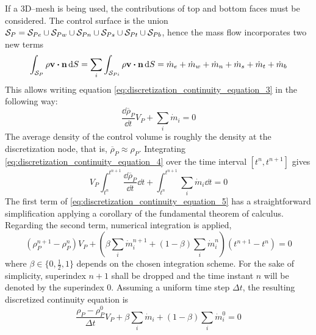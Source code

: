 If a 3D--mesh is being used, the contributions of top and bottom faces must be considered. The control surface is the union $\mathcal{S}_{P} = \mathcal{S}_{Pe} \cup \mathcal{S}_{Pw} \cup \mathcal{S}_{Pn} \cup \mathcal{S}_{Ps} \cup \mathcal{S}_{Pt} \cup \mathcal{S}_{Pb}$, hence the mass flow incorporates two new terms
\begin{equation}
	\int_{\cs{P}} \rho \vb{v} \vdot \vb{n} \dd{S} = 
	\sum_{i} \int_{\cs{Pi}} \rho \vb{v} \vdot \vb{n} \dd{S} = 
	\dot{m}_e + \dot{m}_w + \dot{m}_n + \dot{m}_s + \dot{m}_t + \dot{m}_b
\end{equation}
This allows writing equation \eqref{eq:discretization_continuity_equation_3} in the following way:
\begin{equation} \label{eq:discretization_continuity_equation_4}
	\frac{\dd \overline{\rho}_P}{\dd{t}} V_P + \sum_i \dot{m}_i = 0
\end{equation}
The average density of the control volume is roughly the density at the discretization node, that is, $\overline{\rho}_P \approx \rho_P$. Integrating \eqref{eq:discretization_continuity_equation_4} over the time interval $[t^n, t^{n+1}]$ gives
\begin{equation} \label{eq:discretization_continuity_equation_5}
	V_P \int_{t^n}^{t^{n+1}} \frac{\dd \overline{\rho}_P}{\dd{t}} \dd{t} + 
	\int_{t^n}^{t^{n+1}} \sum_i \dot{m}_i \dd{t} = 0
\end{equation}
The first term of \eqref{eq:discretization_continuity_equation_5} has a straightforward simplification applying a corollary of the fundamental theorem of calculus. Regarding the second term, numerical integration is applied,
\begin{equation} \label{eq:discretization_continuity_equation_6}
	(\rho_P^{n+1} - \rho_P^n) V_P + 
	\left( \beta \sum_i \dot{m}_i^{n+1} + (1 - \beta) \sum_i \dot{m}_i^{n} \right) (t^{n+1} - t^n) = 0
\end{equation}
where $\beta \in \{ 0, \frac{1}{2}, 1 \}$ depends on the chosen integration scheme. For the sake of simplicity, superindex $n+1$ shall be dropped and the time instant $n$ will be denoted by the superindex $0$. Assuming a uniform time step $\Delta t$, the resulting discretized continuity equation is
\begin{equation}
	\frac{\rho_P - \rho_P^0}{\Delta t} V_P + \beta \sum_i \dot{m}_i + (1 - \beta) \sum_i \dot{m}_i^0 = 0
\end{equation}





